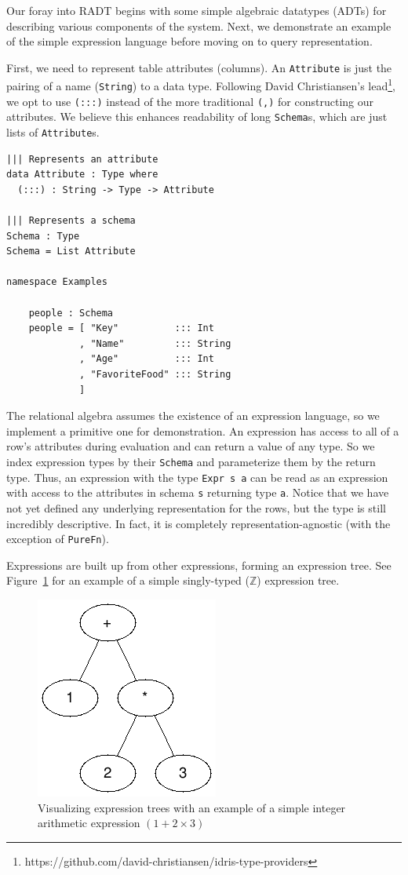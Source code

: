 \documentclass[12pt]{report}
\begin{document}
Our foray into RADT begins with some simple algebraic datatypes (ADTs) for describing various components of the system.
Next, we demonstrate an example of the simple expression language before moving on to query representation.

First, we need to represent table attributes (columns).
An \texttt{Attribute} is just the pairing of a name (\texttt{String}) to a data type.
Following David Christiansen's lead\footnote{https://github.com/david-christiansen/idris-type-providers}, we opt to use \texttt{(:::)} instead of the more traditional \texttt{(,)} for constructing our attributes\cite{ChristiansenTypeProviders}.
We believe this enhances readability of long \texttt{Schema}s, which are just lists of \texttt{Attribute}s.

\begin{lstlisting}[caption={Representing attributes and schemas},label={lst:attrs_and_schemas}]
||| Represents an attribute
data Attribute : Type where
  (:::) : String -> Type -> Attribute

||| Represents a schema
Schema : Type
Schema = List Attribute

namespace Examples

    people : Schema
    people = [ "Key"          ::: Int
             , "Name"         ::: String
             , "Age"          ::: Int
             , "FavoriteFood" ::: String
             ]
\end{lstlisting}

The relational algebra assumes the existence of an expression language, so we implement a primitive one for demonstration.
An expression has access to all of a row's attributes during evaluation and can return a value of any type.
So we index expression types by their \texttt{Schema} and parameterize them by the return type.
Thus, an expression with the type \texttt{Expr s a} can be read as an expression with access to the attributes in schema \texttt{s} returning type \texttt{a}.
Notice that we have not yet defined any underlying representation for the rows, but the type is still incredibly descriptive.
In fact, it is completely representation-agnostic (with the exception of \texttt{PureFn}).

Expressions are built up from other expressions, forming an expression tree.
See Figure~\ref{fig:expr_tree} for an example of a simple singly-typed ($\mathbb Z$) expression tree.

\begin{figure}[h!]
    \centering
    \includegraphics[width=0.25\linewidth]{assets/expr_tree.png}
    \caption{Visualizing expression trees with an example of a simple integer arithmetic expression $(1 + 2 \times 3)$}
    \label{fig:expr_tree}
\end{figure}
\end{document}

